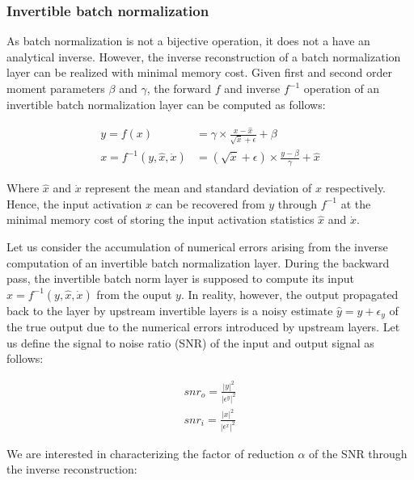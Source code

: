 \documentclass[twocolumn]{bmcart}
\begin{document}
\subsubsection{Invertible batch normalization}

As batch normalization is not a bijective operation, it does not a have an analytical inverse.
However, the inverse reconstruction of a batch normalization layer can be realized with minimal memory cost.
Given first and second order moment parameters $\beta$ and $\gamma$, the forward $f$ and inverse $f^{-1}$ operation of an invertible batch normalization layer can be computed as follows:

\begin{subequations}
\begin{align}
y = f(x) &= \gamma \times \frac{x - \hat{x}}{\sqrt{\dot{x}} + \epsilon} + \beta \\
x = f^{-1}(y, \hat{x}, \dot{x}) &= (\sqrt{\dot{x}} + \epsilon) \times \frac{y -  \beta}{\gamma}  + \hat{x}
\end{align}
\end{subequations}

Where $\hat{x}$ and $\dot{x}$ represent the mean and standard deviation of $x$ respectively.
Hence, the input activation $x$ can be recovered from $y$ through $f^{-1}$ at the minimal memory cost of storing the input activation statistics $\hat{x}$ and $\dot{x}$.

Let us consider the accumulation of numerical errors arising from the inverse computation of an invertible batch normalization layer.
During the backward pass, the invertible batch norm layer is supposed to compute its input $x=f^{-1}(y, \hat{x}, \dot{x})$ from the ouput $y$. 
In reality, however, the output propagated back to the layer by upstream invertible layers is a noisy estimate $\hat{y}=y+\epsilon_y$ of the true output due to the numerical errors introduced by upstream layers. 
Let us define the signal to noise ratio (SNR) of the input and output signal as follows:

\begin{subequations}
\begin{align}
snr_o = \frac{|y|^2}{|\epsilon^y|^2} \\
snr_i = \frac{|x|^2}{|\epsilon^x|^2}  
\end{align}
\end{subequations}

We are interested in characterizing the factor of reduction $\alpha$ of the SNR through the inverse reconstruction:
\end{document}
